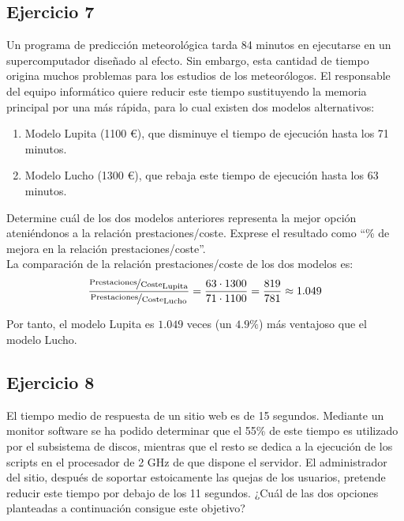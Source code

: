\subsection*{Ejercicio 7}

Un programa de predicción meteorológica tarda 84 minutos en ejecutarse en un supercomputador diseñado al efecto. Sin embargo, esta cantidad de tiempo origina muchos problemas para los estudios de los meteorólogos. El responsable del equipo informático quiere reducir este tiempo sustituyendo la memoria principal por una más rápida, para lo cual existen dos modelos alternativos:

\begin{enumerate}
    \item Modelo Lupita (1100 \euro), que disminuye el tiempo de ejecución hasta los 71 minutos.
    \item Modelo Lucho (1300 \euro), que rebaja este tiempo de ejecución hasta los 63 minutos.
\end{enumerate}
Determine cuál de los dos modelos anteriores representa la mejor opción ateniéndonos a la relación prestaciones/coste. Exprese el resultado como ``\% de mejora en la relación prestaciones/coste''.\\

La comparación de la relación prestaciones/coste de los dos modelos es:
\begin{equation*}
    \frac{\nicefrac{\text{Prestaciones}}{\text{Coste}}_{\text{Lupita}}}{\nicefrac{\text{Prestaciones}}{\text{Coste}}_{\text{Lucho}}} = \dfrac{63\cdot 1300}{71\cdot 1100} = \dfrac{819}{781} \approx 1.049
\end{equation*}

Por tanto, el modelo Lupita es $1.049$ veces (un $4.9\%$) más ventajoso que el modelo Lucho.

\subsection*{Ejercicio 8}

El tiempo medio de respuesta de un sitio web es de 15 segundos. Mediante un monitor software se ha podido determinar que el 55\% de este tiempo es utilizado por el subsistema de discos, mientras que el resto se dedica a la ejecución de los scripts en el procesador de 2 GHz de que dispone el servidor. El administrador del sitio, después de soportar estoicamente las quejas de los usuarios, pretende reducir este tiempo por debajo de los 11 segundos. ¿Cuál de las dos opciones planteadas a continuación consigue este objetivo?

